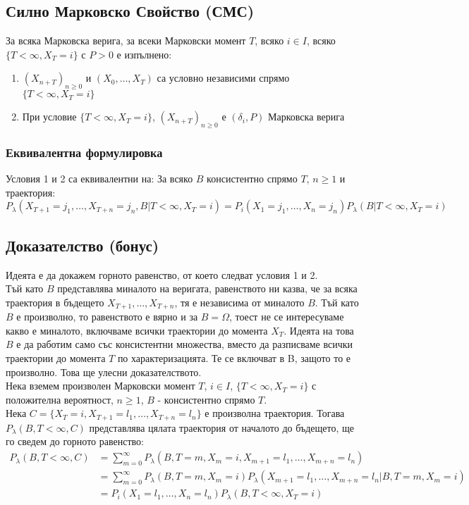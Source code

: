 \documentclass{article}
\begin{document}
\subsection{Силно Марковско Свойство (СМС)}
За всяка Марковска верига, за всеки Марковски момент $T$, всяко $i \in I$, всяко $\{T<\infty, X_T=i\}$ с $P>0$ е изпълнено:
\begin{enumerate}
\item $(X_{n+T})_{n\geq0}$ и $(X_0,\dots,X_T)$ са условно независими спрямо $\{T<\infty, X_T=i\}$
\item При условие $\{T<\infty, X_T=i\}$, $(X_{n+T})_{n\geq0}$ е $(\delta_i,P)$ Марковска верига
\end{enumerate}

\subsubsection*{Еквивалентна формулировка}
Условия 1 и 2 са еквивалентни на: За всяко $B$ консистентно спрямо $T$, $n\geq1$ и траектория:
$$P_\lambda(X_{T+1}=j_1,\dots,X_{T+n}=j_n,B|T<\infty,X_T=i) = P_i(X_1=j_1,\dots,X_n=j_n)P_\lambda(B|T<\infty,X_T=i)$$

\subsection{Доказателство (бонус)}
Идеята е да докажем горното равенство, от което следват условия 1 и 2. \\

Тъй като $B$ представлява миналото на веригата, равенството ни казва, че за всяка траектория в бъдещето $X_{T+1},\dots,X_{T+n}$, тя е независима от миналото $B$. Тъй като $B$ е произволно, то равенството е вярно и за $B=\Omega$, тоест не се интересуваме
какво е миналото, включваме всички траектории до момента $X_T$. Идеята на това $B$ е да работим само със консистентни множества, вместо да разписваме всички траектории до момента $T$ по характеризацията. Те се включват в B, защото то е произволно. Това ще улесни доказателството.\\

Нека вземем произволен Марковски момент $T$, $i\in I$, $\{T<\infty, X_T=i\}$ с положителна вероятност, $n\geq1$, $B$ - консистентно спрямо $T$. \\

Нека $C=\{X_T=i,X_{T+1}=l_1,\dots,X_{T+n}=l_n\}$ е произволна траектория. Тогава $P_\lambda(B,T<\infty,C)$ представлява цялата траектория от началото до бъдещето, ще го сведем до
горното равенство:
\begin{align*}
P_\lambda(B,T<\infty,C) &= \sum_{m=0}^\infty P_\lambda(B,T=m,X_m=i,X_{m+1}=l_1,\dots,X_{m+n}=l_n) \\
&= \sum_{m=0}^\infty P_\lambda(B,T=m, X_m=i)P_\lambda(X_{m+1}=l_1,\dots,X_{m+n}=l_n|B, T=m,X_m=i) \\
&= P_i(X_1=l_1,\dots,X_n=l_n)P_\lambda(B,T<\infty,X_T=i)
\end{align*}
\end{document}
